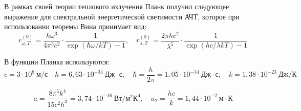 В рамках своей теории теплового излучения Планк получил следующее выражение для спектральной энергетической светимости АЧТ, которое при использовании теоремы Вина принимает вид:
\[
r^{(0)}_{\omega,T} = \frac{\hbar \omega^3}{4\pi^3 c^2} \cdot \frac{1}{\exp(\hbar\omega/kT) - 1}, \quad
r^{(0)}_{\lambda,T} = \frac{2\pi hc^2}{\lambda^5} \cdot \frac{1}{\exp(hc/\lambda kT) - 1} \tag{11.6}
\]

В функции Планка используются:
\[
c = 3 \cdot 10^8~\text{м/с} \quad
h = 6{,}63 \cdot 10^{-34}~\text{Дж}\cdot\text{с}, \quad
\hbar = \frac{h}{2\pi} = 1{,}05 \cdot 10^{-34}~\text{Дж}\cdot\text{с}, \quad
k = 1{,}38 \cdot 10^{-23}~\text{Дж}/\text{К}
\]

\[
a = \frac{8\pi^5 k^4}{15c^2h^3} = 3{,}74 \cdot 10^{-16}~\text{Вт}/\text{м}^2\text{К}^4, \quad
a_2 = \frac{hc}{k} = 1{,}44 \cdot 10^{-2}~\text{м}\cdot\text{К}
\]
